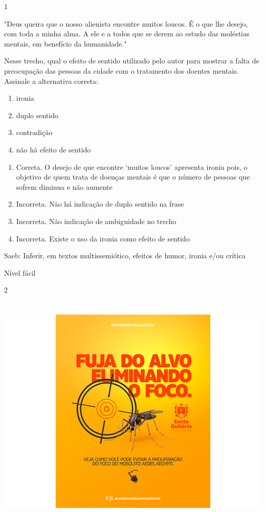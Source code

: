 {

\num{1}

"Deus queira que o nosso alienista encontre muitos loucos. É o que lhe
desejo, com toda a minha alma. A ele e a todos que se derem ao estudo
das moléstias mentais, em benefício da humanidade."

Nesse trecho, qual o efeito de sentido utilizado pelo autor para mostrar
a falta de preocupação das pessoas da cidade com o tratamento dos
doentes mentais. Assinale a alternativa correta:

\begin{enumerate}
\def\labelenumi{\alph{enumi})}
\item
  ironia
\item
  duplo sentido
\item
  contradição
\item
  não há efeito de sentido
\end{enumerate}

\begin{enumerate}
\def\labelenumi{\alph{enumi})}
\item
  Correta. O desejo de que encontre `muitos loucos' apresenta ironia
  pois, o objetivo de quem trata de doenças mentais é que o número de
  pessoas que sofrem diminua e não aumente
\item
  Incorreta. Não há indicação de duplo sentido na frase
\item
  Incorreta. Não indicação de ambiguidade no trecho
\item
  Incorreta. Existe o uso da ironia como efeito de sentido
\end{enumerate}

Saeb: Inferir, em textos multissemiótico, efeitos de humor, ironia e/ou
crítica

Nível fácil

\num{2}

\includegraphics[width=5.90551in,height=4.43056in]{./imgSAEB_7_POR/media/image6.png}

}
